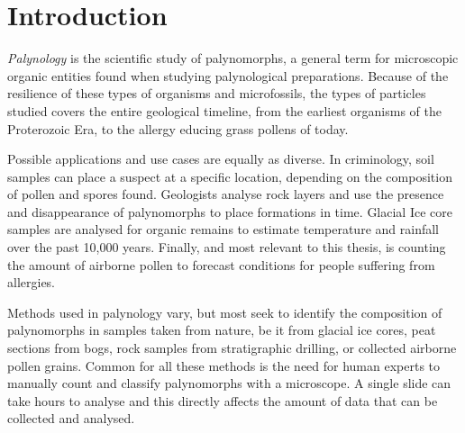 \chapter{Introduction}\label{cha:Introduction}


\textit{Palynology} is the scientific study of palynomorphs, a general term for microscopic organic entities found when studying palynological preparations.
Because of the resilience of these types of organisms and microfossils, the types of particles studied covers the entire geological timeline, from the earliest organisms of the Proterozoic Era, to the allergy educing grass pollens of today.

Possible applications and use cases are equally as diverse.
In criminology, soil samples can place a suspect at a specific location, depending on the composition of pollen and spores found.
Geologists analyse rock layers and use the presence and disappearance of palynomorphs to place formations in time.
Glacial Ice core samples are analysed for organic remains to estimate temperature and rainfall over the past 10,000 years.
Finally, and most relevant to this thesis, is counting the amount of airborne pollen to forecast conditions for people suffering from allergies.

Methods used in palynology vary, but most seek to identify the composition of palynomorphs in samples taken from nature, be it from glacial ice cores, peat sections from bogs, rock samples from stratigraphic drilling, or collected airborne pollen grains.
Common for all these methods is the need for human experts to manually count and classify palynomorphs with a microscope.
A single slide can take hours to analyse and this directly affects the amount of data that can be collected and analysed.

